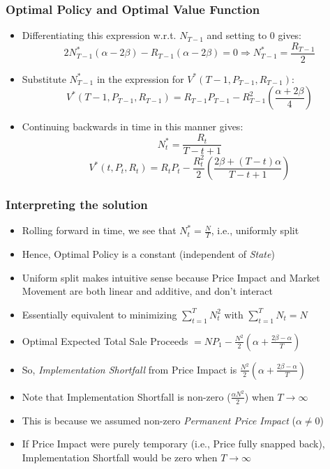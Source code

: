 \documentclass[handout]{beamer}
\begin{document}
\begin{frame}
\frametitle{Optimal Policy and Optimal Value Function}
\pause
\begin{itemize}
\item Differentiating this expression w.r.t. $N_{T-1}$ and setting to 0 gives:
$$2N^*_{T-1} (\alpha - 2\beta) - R_{T-1}(\alpha - 2\beta) = 0 \Rightarrow N^*_{T-1} = \frac {R_{T-1}} 2$$
\pause
\item Substitute $N^*_{T-1}$ in the expression for $V^*(T-1,P_{T-1},R_{T-1})$:
$$V^*(T-1,P_{T-1},R_{T-1}) =  R_{T-1} P_{T-1} - R_{T-1}^2 (\frac {\alpha + 2\beta} 4)$$
\pause
\item Continuing backwards in time in this manner gives:
$$N^*_t = \frac {R_t} {T-t+1}$$
\pause
$$V^*(t, P_t,R_t) = R_t P_t - \frac {R_t^2} 2 (\frac {2\beta + (T-t)\alpha} {T-t+1})$$
\end{itemize}
\end{frame}

\begin{frame}
\frametitle{Interpreting the solution}
\pause
\begin{itemize}[<+->]
\item Rolling forward in time, we see that $N^*_t = \frac N T$, i.e., uniformly split
\item Hence, Optimal Policy is a constant (independent of {\em State})
\item Uniform split makes intuitive sense because Price Impact and Market Movement are both linear and additive, and don't interact
\item Essentially equivalent to minimizing $\sum_{t=1}^T N_t^2$ with $\sum_{t=1}^T N_t = N$
\item Optimal Expected Total Sale Proceeds $= NP_1 - \frac {N^2} 2 (\alpha + \frac {2\beta - \alpha} T)$
\item So, {\em Implementation Shortfall} from Price Impact is $\frac {N^2} 2 (\alpha + \frac {2\beta - \alpha} T)$
\item Note that Implementation Shortfall is non-zero ($\frac {\alpha N^2} 2$) when $T\rightarrow \infty$
\item This is because we assumed non-zero {\em Permanent Price Impact} ($\alpha \neq 0$)
\item If Price Impact were purely temporary (i.e., Price fully snapped back), Implementation Shortfall would be zero when $T\rightarrow \infty$
\end{itemize}
\end{frame}
\end{document}
